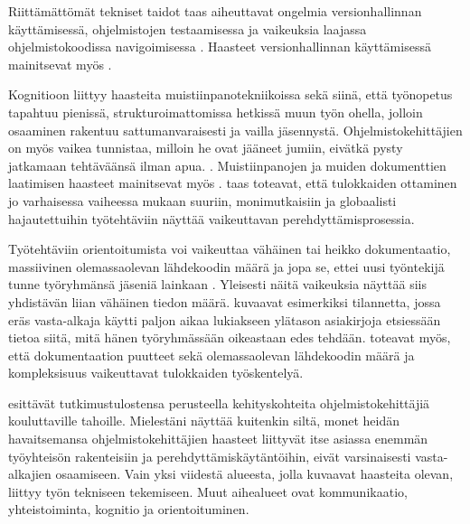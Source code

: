 \documentclass[utf8]{gradu3}
\begin{document}
Riittämättömät tekniset taidot taas aiheuttavat ongelmia versionhallinnan käyttämisessä, ohjelmistojen testaamisessa ja vaikeuksia laajassa ohjelmistokoodissa navigoimisessa \parencite{begel-simon-2008}. Haasteet versionhallinnan käyttämisessä mainitsevat myös \textcite{radermacher-ym-2015}.

Kognitioon liittyy haasteita muistiinpanotekniikoissa sekä siinä, että työnopetus tapahtuu pienissä, strukturoimattomissa hetkissä muun työn ohella, jolloin osaaminen rakentuu sattumanvaraisesti ja vailla jäsennystä. Ohjelmistokehittäjien on myös vaikea tunnistaa, milloin he ovat jääneet jumiin, eivätkä pysty jatkamaan tehtäväänsä ilman apua. \parencite{begel-simon-2008}. Muistiinpanojen ja muiden dokumenttien laatimisen haasteet mainitsevat myös \textcite{radermacher-ym-2015}. \textcite{britto-ym-2019} taas toteavat, että tulokkaiden ottaminen jo varhaisessa vaiheessa mukaan suuriin, monimutkaisiin ja globaalisti hajautettuihin työtehtäviin näyttää vaikeuttavan perehdyttämisprosessia.

Työtehtäviin orientoitumista voi vaikeuttaa vähäinen tai heikko dokumentaatio, massiivinen olemassaolevan lähdekoodin määrä ja jopa se, ettei uusi työntekijä tunne työryhmänsä jäseniä lainkaan \parencite{begel-simon-2008}. Yleisesti näitä vaikeuksia näyttää siis yhdistävän liian vähäinen tiedon määrä. \textcite{begel-simon-2008} kuvaavat esimerkiksi tilannetta, jossa eräs vasta-alkaja käytti paljon aikaa lukiakseen ylätason asiakirjoja etsiessään tietoa siitä, mitä hänen työryhmässään oikeastaan edes tehdään. \textcite{britto-ym-2019} toteavat myös, että dokumentaation puutteet sekä olemassaolevan lähdekoodin määrä ja kompleksisuus vaikeuttavat tulokkaiden työskentelyä.

\textcite{begel-simon-2008} esittävät tutkimustulostensa perusteella kehityskohteita ohjelmistokehittäjiä kouluttaville tahoille. Mielestäni näyttää kuitenkin siltä, monet heidän havaitsemansa ohjelmistokehittäjien haasteet liittyvät itse asiassa enemmän työyhteisön rakenteisiin ja perehdyttämiskäytäntöihin, eivät varsinaisesti vasta-alkajien osaamiseen. Vain yksi viidestä alueesta, jolla \textcite{begel-simon-2008} kuvaavat haasteita olevan, liittyy työn tekniseen tekemiseen. Muut aihealueet ovat kommunikaatio, yhteistoiminta, kognitio ja orientoituminen.

\end{document}
